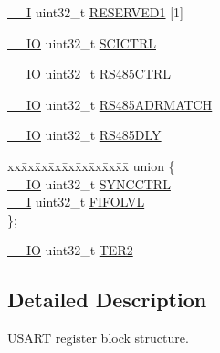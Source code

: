 \begin{DoxyCompactItemize}
\hyperlink{core__cm3_8h_af63697ed9952cc71e1225efe205f6cd3}{\-\_\-\-\_\-\-I} uint32\-\_\-t \hyperlink{structLPC__USART__T_a56453758b5fec0a80c808f746e3db741}{R\-E\-S\-E\-R\-V\-E\-D1} \mbox{[}1\mbox{]}
\item 
\hyperlink{core__cm3_8h_aec43007d9998a0a0e01faede4133d6be}{\-\_\-\-\_\-\-I\-O} uint32\-\_\-t \hyperlink{structLPC__USART__T_aa8ad1461441995d0b618ff7f5b0e42be}{S\-C\-I\-C\-T\-R\-L}
\item 
\hyperlink{core__cm3_8h_aec43007d9998a0a0e01faede4133d6be}{\-\_\-\-\_\-\-I\-O} uint32\-\_\-t \hyperlink{structLPC__USART__T_a6a7e49f50f49efbe8e11befcf6e7d6b4}{R\-S485\-C\-T\-R\-L}
\item 
\hyperlink{core__cm3_8h_aec43007d9998a0a0e01faede4133d6be}{\-\_\-\-\_\-\-I\-O} uint32\-\_\-t \hyperlink{structLPC__USART__T_adfc2810503e8eb5f4d9bc4622500295e}{R\-S485\-A\-D\-R\-M\-A\-T\-C\-H}
\item 
\hyperlink{core__cm3_8h_aec43007d9998a0a0e01faede4133d6be}{\-\_\-\-\_\-\-I\-O} uint32\-\_\-t \hyperlink{structLPC__USART__T_a6e9fc8109a269820386a36c81dc943ab}{R\-S485\-D\-L\-Y}
\item 
\begin{tabbing}
xx\=xx\=xx\=xx\=xx\=xx\=xx\=xx\=xx\=\kill
union \{\\
\>\hyperlink{core__cm3_8h_aec43007d9998a0a0e01faede4133d6be}{\_\_IO} uint32\_t \hyperlink{structLPC__USART__T_a799433e27ab7a1b61ba215ff1766a3e0}{SYNCCTRL}\\
\>\hyperlink{core__cm3_8h_af63697ed9952cc71e1225efe205f6cd3}{\_\_I} uint32\_t \hyperlink{structLPC__USART__T_a1e5a80261f84a375eda3b575bea8074a}{FIFOLVL}\\
\}; \\

\end{tabbing}\item 
\hyperlink{core__cm3_8h_aec43007d9998a0a0e01faede4133d6be}{\-\_\-\-\_\-\-I\-O} uint32\-\_\-t \hyperlink{structLPC__USART__T_afc422e0333356dc62b23d404bfdbd1de}{T\-E\-R2}
\end{DoxyCompactItemize}


\subsection{Detailed Description}
U\-S\-A\-R\-T register block structure. 


